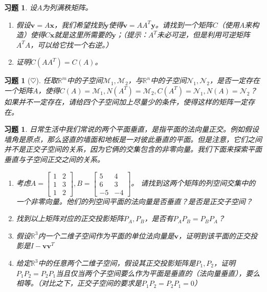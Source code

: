 \documentclass[UTF8]{ctexart}
\newcommand{\Ker}{N}
\newcommand{\nullspace}{N}
\newtheorem{ex}[thm]{习题}
\begin{document}
\begin{ex}
设$A$为列满秩矩阵。
\begin{enumerate}
\item 假设$\bm v=A\bm x$，我们希望找到$\bm y$使得$\bm v=AA^T\bm y$。请找到一个矩阵$C$（使用$A$来构造）使得$C\bm x$就是这里所需要的$\bm y$；（提示：$A^T$未必可逆，但是利用可逆矩阵$A^TA$，可以给它找一个右逆。）
\item 证明$C(AA^T)=C(A)$。
\end{enumerate}
\end{ex}




\begin{ex}[$\heartsuit $]
任取$\mathbb{R}^m$中的子空间$\mathcal{M}_1,\mathcal{M}_2$，与$\mathbb{R}^n$中的子空间$\mathcal{N}_1,\mathcal{N}_2$，是否一定存在一个矩阵$A$，使得$C(A)=\mathcal{M}_1,\nullspace(A^{T})=\mathcal{M}_2, C(A^{T})=\mathcal{N}_1,\nullspace(A)=\mathcal{N}_2$？如果并不一定存在，请给四个子空间加上尽量少的条件，使得这样的矩阵一定存在。
\end{ex}




\begin{ex}
日常生活中我们常说的两个平面垂直，是指平面的法向量正交。例如假设墙角是原点，那么竖直的墙面和地板是一对彼此垂直的平面。但是注意，它们之间并不是正交子空间的关系，因为它俩的交集包含的非零向量。我们下面来探索平面垂直与子空间正交之间的关系。
\begin{enumerate}
\item 考虑$A=\begin{bmatrix}1&2\\1&3\\1&2\end{bmatrix},B=\begin{bmatrix}5&4\\6&3\\-5&-4\end{bmatrix}$。 请找到这两个矩阵的列空间交集中的一个非零向量。他们的列空间平面的法向量是否垂直？是否是正交子空间？
\item 找到以上矩阵对应的正交投影矩阵$P_A,P_B$，是否有$P_AP_B=P_BP_A$？
\item 假设$\mathbb{R}^3$内一个二维子空间作为平面的单位法向量是$\bm v$，证明到该平面的正交投影是$I-\bm v\bm v^T$
\item 给定$\mathbb{R}^3$中的任意两个二维子空间，假设其正交投影矩阵是$P_1,P_2$，证明$P_1P_2=P_2P_1$当且仅当两个子空间要么作为平面是垂直的（法向量垂直），要么相等。（对比之下，正交子空间的要求是$P_1P_2=P_2P_1=0$）
\end{enumerate}
\end{ex}
\end{document}
